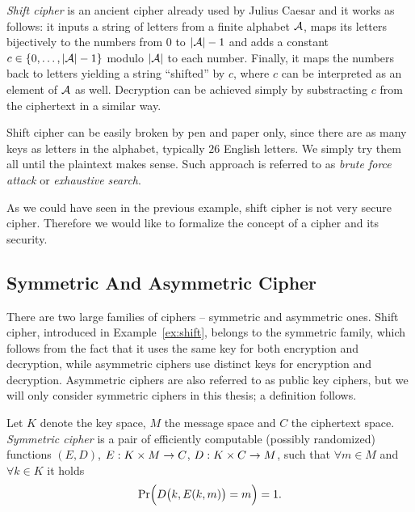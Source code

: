 \begin{example}
\label{ex:shift}
	{\em Shift cipher} \cite{menezes1996handbook} is an ancient cipher already used by Julius Caesar and it works as follows: it inputs a string of letters from a finite alphabet $\cal A$, maps its letters bijectively to the numbers from $0$ to $|{\cal A}|-1$ and adds a constant $c\in\{0 , \ldots , |{\cal A}|-1\}$ modulo $|\cal A|$ to each number. Finally, it maps the numbers back to letters yielding a string ``shifted'' by $c$, where $c$ can be interpreted as an element of $\cal A$ as well. Decryption can be achieved simply by substracting $c$ from the ciphertext in a similar way.
	
	Shift cipher can be easily broken by pen and paper only, since there are as many keys as letters in the alphabet, typically $26$ English letters. We simply try them all until the plaintext makes sense. Such approach is referred to as {\em brute force attack} or {\em exhaustive search}.
\end{example}

As we could have seen in the previous example, shift cipher is not very secure cipher. Therefore we would like to formalize the concept of a cipher and its security.



\subsection{Symmetric And Asymmetric Cipher}

There are two large families of ciphers -- symmetric and asymmetric ones. Shift cipher, introduced in Example~\ref{ex:shift}, belongs to the symmetric family, which follows from the fact that it uses the same key for both encryption and decryption, while asymmetric ciphers use distinct keys for encryption and decryption. Asymmetric ciphers are also referred to as public key ciphers, but we will only consider symmetric ciphers in this thesis; a definition follows.

\begin{defn}
\label{def:symcipher}
	Let $K$ denote the key space, $M$ the message space and $C$ the ciphertext space. {\em Symmetric cipher} is a pair of efficiently computable (possibly randomized) functions $(E,D)$, $E:K\times M\rightarrow C$, $D:K\times C\rightarrow M$, such that $\forall m\in M$ and $\forall k\in K$ it holds   %
	\begin{equation}
	\label{eq:correct}
		\Pr\Bigl(D\bigl(k,E(k,m)\bigr)=m\Bigr) = 1 .
	\end{equation}
\end{defn}

